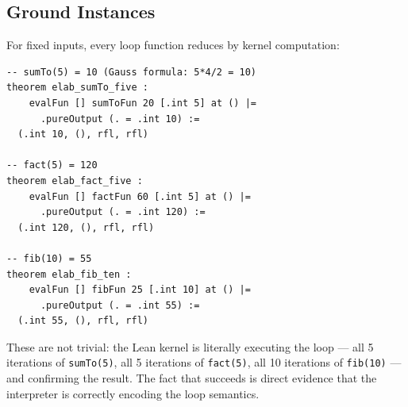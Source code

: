 \subsection{Ground Instances}

For fixed inputs, every loop function reduces by kernel computation:

\begin{lstlisting}[caption={Ground instances proved by rfl.},label={lst:ground}]
-- sumTo(5) = 10 (Gauss formula: 5*4/2 = 10)
theorem elab_sumTo_five :
    evalFun [] sumToFun 20 [.int 5] at () |=
      .pureOutput (. = .int 10) :=
  (.int 10, (), rfl, rfl)

-- fact(5) = 120
theorem elab_fact_five :
    evalFun [] factFun 60 [.int 5] at () |=
      .pureOutput (. = .int 120) :=
  (.int 120, (), rfl, rfl)

-- fib(10) = 55
theorem elab_fib_ten :
    evalFun [] fibFun 25 [.int 10] at () |=
      .pureOutput (. = .int 55) :=
  (.int 55, (), rfl, rfl)
\end{lstlisting}

These are not trivial: the Lean kernel is literally executing the loop —
all 5 iterations of \texttt{sumTo(5)}, all 5 iterations of \texttt{fact(5)},
all 10 iterations of \texttt{fib(10)} — and confirming the result. The fact
that \rfl succeeds is direct evidence that the interpreter is correctly
encoding the loop semantics.
